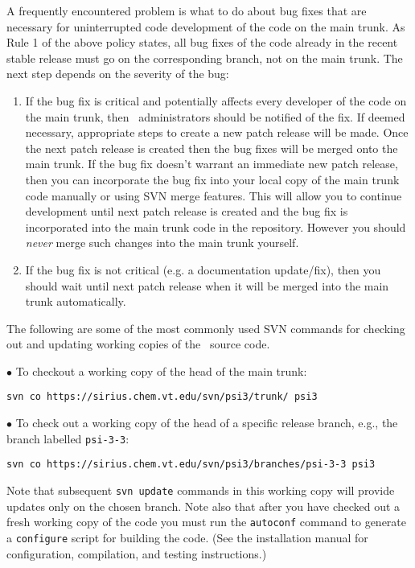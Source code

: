 \noindent A frequently encountered problem is what to do about bug fixes
that are necessary for uninterrupted code development of the code on the
main trunk. As Rule 1 of the above policy states, all bug fixes of the code
already in the recent stable release must go on the corresponding branch,
not on the main trunk. The next step depends on the severity of the bug:
\begin{enumerate}
\item If the bug fix is critical and potentially affects every
  developer of the code on the main trunk, then \PSIthree\
  administrators should be notified of the fix. If deemed necessary,
  appropriate steps to create a new patch release will be made. Once
  the next patch release is created then the bug fixes will be merged
  onto the main trunk.  If the bug fix doesn't warrant an immediate
  new patch release, then you can incorporate the bug fix into your
  local copy of the main trunk code manually or using SVN merge
  features. This will allow you to continue development until next
  patch release is created and the bug fix is incorporated into the
  main trunk code in the repository. However you should {\em never}
  merge such changes into the main trunk yourself.
\item If the bug fix is not critical (e.g. a documentation
  update/fix), then you should wait until next patch release when it
  will be merged into the main trunk automatically.
\end{enumerate}

\noindent
The following are some of the most commonly used SVN commands for checking
out and updating working copies of the \PSIthree\ source code.

\noindent
$\bullet$ To checkout a working copy of the head of the main trunk:

{\tt svn co https://sirius.chem.vt.edu/svn/psi3/trunk/ psi3} 

\noindent
$\bullet$ To check out a working copy of the head of a specific release branch,
e.g., the branch labelled {\tt psi-3-3}:

{\tt svn co https://sirius.chem.vt.edu/svn/psi3/branches/psi-3-3 psi3}

\noindent Note that subsequent {\tt svn update} commands in this
working copy will provide updates only on the chosen branch.  Note
also that after you have checked out a fresh working copy of the code
you must run the {\tt autoconf} command to generate a {\tt configure}
script for building the code.  (See the installation manual for
configuration, compilation, and testing instructions.)

